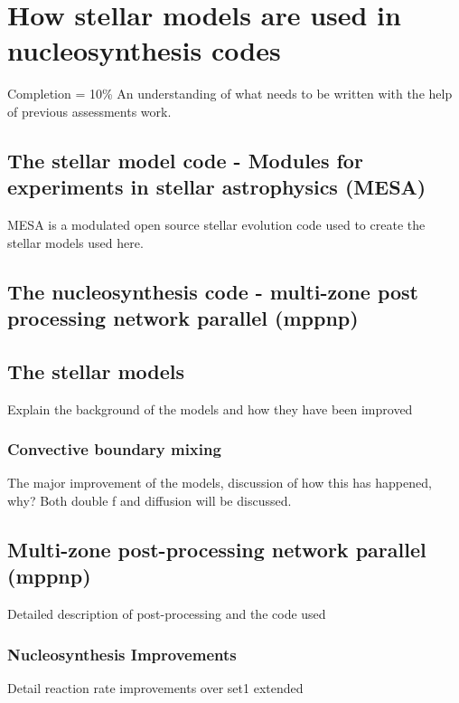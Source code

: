 \chapter{How stellar models are used in nucleosynthesis codes}

Completion = 10\%
An understanding of what needs to be written with the help of previous assessments work.

\section{The stellar model code - Modules for experiments in stellar astrophysics (MESA)}

MESA is a modulated open source stellar evolution code used to create the stellar models used here.

\section{The nucleosynthesis code - multi-zone post processing network parallel (mppnp)}

\section{The stellar models}

Explain the background of the models and how they have been improved

\subsection{Convective boundary mixing}

The major improvement of the models, discussion of how this has happened, why? Both double f and diffusion will be discussed.

\section{Multi-zone post-processing network parallel (mppnp)}

Detailed description of post-processing and the code used

\subsection{Nucleosynthesis Improvements}

Detail reaction rate improvements over set1 extended
